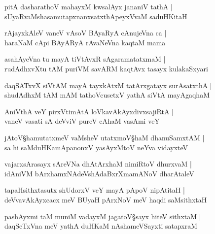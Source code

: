 \begin{shloka}
pitA dasharathoV mahayxM kwsalAyx jananiV tathA |\\
sUyaRvaMshasamutapxnanxsatxthApeyxVvaM saduHKitaH 
\end{shloka}

\begin{shloka}
rAjayxkAleV vaneV vAsoV BAyaRyA cAnujeVna ca |\\
haraNaM cApi BAyARyA rAvaNeVna kaqtaM mama
\end{shloka}

\begin{shloka}
asahAyeVna tu mayA tiVtAvxR sAgaramatatxmaM |\\
rudAdhxvXtu tAM puriVM savARM kaqtAvx tasayx kulakaSxyari 
\end{shloka}

\begin{shloka}
daqSATxvX siVtAM mayA tayxkAtxM tatArxgatayx surAsatxthA |\\
shudAdhxM tAM mAM tathoVcusetxV yathA siVtA mayAgaqhaM 
\end{shloka}

\begin{shloka}
AniVthA veY pirxVtimAtA loVkavAkAyxdivxsajiRtA |\\
vaneV vasati sA deVviV pureV cAhaM vasAmi veY 
\end{shloka}

\begin{shloka}
jAtoV\S hamutatxmeV vaMsheV utatxmoV\S haM dhanuSamxtAM |\\
sa hi saMduHKamApanonxV yasAyxMtoV neYva vidayxteV
\end{shloka}

\begin{shloka}
vajarxsArasayx sAreVNa dhAtArxhaM nimiRtoV dhurxvaM |\\
idAniVM bArxhamxNAdeVshAdaBxrXmamANoV dharAtaleV 
\end{shloka}

\begin{shloka}
tapaHsithxtasutx shUdorxV veY mayA pApoV nipAtitaH |\\
deVvavAkAyxcacx meV BUyaH pArxNoV meV haqdi saMsithxtaH 
\end{shloka}

\begin{shloka}
pashAyxmi taM muniM vadayxM jagatoV\S sayx hiteV sithxtaM |\\
daqSeTxVna meV yathA duHKaM nAshameVSayxti satapxraM
\end{shloka}

